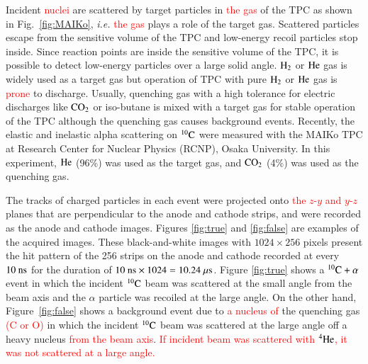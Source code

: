\documentclass{jps-cp}
\begin{document}
Incident \textcolor{red}{nuclei} are scattered by target particles in \textcolor{red}{the gas} of the TPC as shown in Fig.~\ref{fig:MAIKo}, {\it i.e.} \textcolor{red}{the gas} plays a role of the target gas.
Scattered particles escape from the sensitive volume of the TPC and low-energy recoil particles stop inside.
Since reaction points are inside the sensitive volume of the TPC,
it is possible to detect low-energy particles over a large solid angle.
$\rm{H}_{2}$ or $\rm{He}$ gas is widely used as a target gas
but operation of TPC with pure $\rm{H}_{2}$ or $\rm{He}$ gas is \textcolor{red}{prone} to discharge.
Usually, quenching gas with a high tolerance for electric discharges
like $\rm{CO}_{2}$ or iso-butane is mixed with a target gas
for stable operation of the TPC although the quenching gas causes background events.
Recently, the elastic and inelastic alpha scattering on ${}^{10}\rm{C}$ were measured with the MAIKo TPC
at Research Center for Nuclear Physics (RCNP), Osaka University.
In this experiment, $\rm{He}$ (96\%) was used as the target gas, and $\rm{CO}_{2}$ (4\%) was used as the quenching gas.

The tracks of charged particles in each event were projected onto \textcolor{red}{the $z$-$y$ and $y$-$z$} planes that are perpendicular to the anode and cathode strips, and were recorded as the anode and cathode images.
Figures \ref{fig:true} and \ref{fig:false} are examples of the acquired images.
These black-and-white images with $1024\times 256$ pixels present the hit pattern of the 256 strips on the anode and cathode recorded
at every $10~\rm{ns}$ for the duration of $10~\rm{ns}\times 1024 = 10.24~\rm{\mu s}$.
Figure \ref{fig:true} shows a ${}^{10}\rm{C}+\alpha$ event
in which the incident ${}^{10}\rm{C}$ beam was scattered at the small angle from the beam axis and the $\alpha$ particle was
recoiled at the large angle.
On the other hand, Figure~\ref{fig:false} shows a background event due to \textcolor{red}{a nucleus of} the quenching gas \textcolor{red}{(C or O)}
in which the incident ${}^{10}\rm{C}$ beam was scattered at the large angle off a heavy nucleus \textcolor{red}{from the beam axis}.
\textcolor{red}{If incident beam was scattered with ${}^{4}\rm{He}$, it was not scattered at a large angle.}
\end{document}
